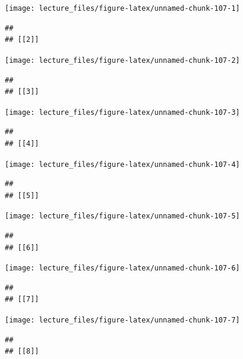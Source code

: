 \documentclass[
]{book}
\begin{document}
\begin{center}\texttt{[image: lecture\_files/figure-latex/unnamed-chunk-107-1]} \end{center}

\begin{verbatim}
## 
## [[2]]
\end{verbatim}

\begin{center}\texttt{[image: lecture\_files/figure-latex/unnamed-chunk-107-2]} \end{center}

\begin{verbatim}
## 
## [[3]]
\end{verbatim}

\begin{center}\texttt{[image: lecture\_files/figure-latex/unnamed-chunk-107-3]} \end{center}

\begin{verbatim}
## 
## [[4]]
\end{verbatim}

\begin{center}\texttt{[image: lecture\_files/figure-latex/unnamed-chunk-107-4]} \end{center}

\begin{verbatim}
## 
## [[5]]
\end{verbatim}

\begin{center}\texttt{[image: lecture\_files/figure-latex/unnamed-chunk-107-5]} \end{center}

\begin{verbatim}
## 
## [[6]]
\end{verbatim}

\begin{center}\texttt{[image: lecture\_files/figure-latex/unnamed-chunk-107-6]} \end{center}

\begin{verbatim}
## 
## [[7]]
\end{verbatim}

\begin{center}\texttt{[image: lecture\_files/figure-latex/unnamed-chunk-107-7]} \end{center}

\begin{verbatim}
## 
## [[8]]
\end{verbatim}
\end{document}
